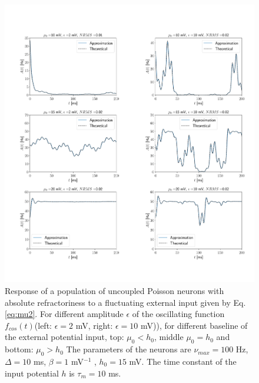 \documentclass[12pt,twoside]{report}
\begin{document}
\begin{figure}[h!]
	\centering
	\includegraphics[width=0.9\linewidth]{A_t.pdf}
	\caption{Response of a population of uncoupled Poisson neurons with absolute refractoriness to a fluctuating external input given by Eq.\eqref{eq:mu2}. For different amplitude $\epsilon$ of the oscillating function $f_{cos}(t)$(left: $\epsilon=2$ mV, right: $\epsilon=10$ mV)), for different baseline of the external potential input, top: $\mu_0 < h_0$, middle  $\mu_0 = h_0$ and bottom: $\mu_0 > h_0$ The parameters of the neurons are $\nu_{max}=100$ Hz, $\Delta=10$ ms, $\beta=1$ mV$^{-1}$ , $h_0=15$ mV. The time constant of the input potential $h$ is $\tau_m=10$ ms.
	}
	\label{fig:A_t}
\end{figure}
\end{document}
